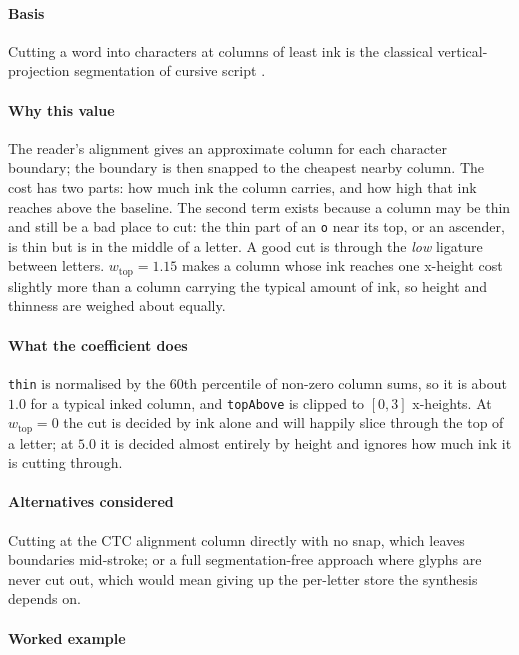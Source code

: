 \paragraph{Basis}

Cutting a word into characters at columns of least ink is the classical vertical-projection segmentation of cursive script \cite{likforman2007,vinciarelli2001}.

\paragraph{Why this value}

The reader's alignment gives an approximate column for each character boundary; the boundary is then snapped to the cheapest nearby column. The cost has two parts: how much ink the column carries, and how high that ink reaches above the baseline. The second term exists because a column may be thin and still be a bad place to cut: the thin part of an \texttt{o} near its top, or an ascender, is thin but is in the middle of a letter. A good cut is through the \emph{low} ligature between letters. $w_{\text{top}} = 1.15$ makes a column whose ink reaches one x-height cost slightly more than a column carrying the typical amount of ink, so height and thinness are weighed about equally.

\paragraph{What the coefficient does}

\texttt{thin} is normalised by the $60$th percentile of non-zero column sums, so it is about $1.0$ for a typical inked column, and \texttt{topAbove} is clipped to $[0,3]$ x-heights. At $w_{\text{top}} = 0$ the cut is decided by ink alone and will happily slice through the top of a letter; at $5.0$ it is decided almost entirely by height and ignores how much ink it is cutting through.

\paragraph{Alternatives considered}

Cutting at the CTC alignment column directly with no snap, which leaves boundaries mid-stroke; or a full segmentation-free approach where glyphs are never cut out, which would mean giving up the per-letter store the synthesis depends on.

\paragraph{Worked example}


